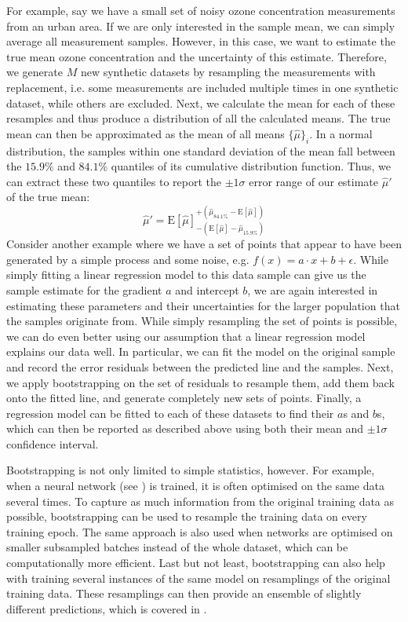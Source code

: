 For example, say we have a small set of noisy ozone concentration measurements from an urban area. If we are only interested in the sample mean, we can simply average all measurement samples. However, in this case, we want to estimate the true mean ozone concentration and the uncertainty of this estimate. Therefore, we generate $M$ new synthetic datasets by resampling the measurements with replacement, i.e. some measurements are included multiple times in one synthetic dataset, while others are excluded. Next, we calculate the mean for each of these resamples and thus produce a distribution of all the calculated means. The true mean can then be approximated as the mean of all means $\{\hat{\mu}\}_{i}$. In a normal distribution, the samples within one standard deviation of the mean fall between the $15.9\%$ and $84.1\%$ quantiles of its cumulative distribution function. Thus, we can extract these two quantiles to report the $\pm 1\sigma$ error range of our estimate $\hat{\mu}'$ of the true mean:
\begin{equation*}
    \hat{\mu}' = {\text{E}[\hat{\mu}]}^{+(\hat{\mu}_{84.1\%} - \text{E}[\hat{\mu}])}_{-(\text{E}[\hat{\mu}] - \hat{\mu}_{15.9\%})} 
\end{equation*}
\noindent Consider another example where we have a set of points that appear to have been generated by a simple process and some noise, e.g. $f(x) = a \cdot x + b + \epsilon$. While simply fitting a linear regression model to this data sample can give us the sample estimate for the gradient $a$ and intercept $b$, we are again interested in estimating these parameters and their uncertainties for the larger population that the samples originate from. While simply resampling the set of points is possible, we can do even better using our assumption that a linear regression model explains our data well. In particular, we can fit the model on the original sample and record the error residuals between the predicted line and the samples. Next, we apply bootstrapping on the set of residuals to resample them, add them back onto the fitted line, and generate completely new sets of points. Finally, a regression model can be fitted to each of these datasets to find their $a$s and $b$s, which can then be reported as described above using both their mean and $\pm 1\sigma$ confidence interval.

\newpar Bootstrapping is not only limited to simple statistics, however. For example, when a neural network (see ) is trained, it is often optimised on the same data several times. To capture as much information from the original training data as possible, bootstrapping can be used to resample the training data on every training epoch. The same approach is also used when networks are optimised on smaller subsampled batches instead of the whole dataset, which can be computationally more efficient. Last but not least, bootstrapping can also help with training several instances of the same model on resamplings of the original training data. These resamplings can then provide an ensemble of slightly different predictions, which is covered in .


